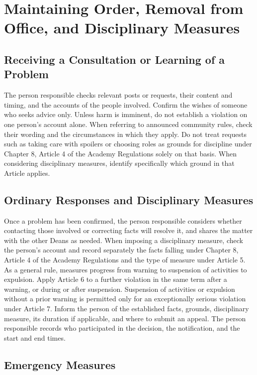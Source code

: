 \newpage
\chapter{Maintaining Order, Removal from Office, and Disciplinary Measures}

\section{Receiving a Consultation or Learning of a Problem}

The person responsible checks relevant posts or requests, their content and timing, and the accounts of the people involved.
Confirm the wishes of someone who seeks advice only. Unless harm is imminent, do not establish a violation on one person's account alone.
When referring to announced community rules, check their wording and the circumstances in which they apply.
Do not treat requests such as taking care with spoilers or choosing roles as grounds for discipline under Chapter 8, Article 4 of the Academy Regulations solely on that basis.
When considering disciplinary measures, identify specifically which ground in that Article applies.

\section{Ordinary Responses and Disciplinary Measures}

Once a problem has been confirmed, the person responsible considers whether contacting those involved or correcting facts will resolve it, and shares the matter with the other Deans as needed.
When imposing a disciplinary measure, check the person's account and record separately the facts falling under Chapter 8, Article 4 of the Academy Regulations and the type of measure under Article 5.
As a general rule, measures progress from warning to suspension of activities to expulsion. Apply Article 6 to a further violation in the same term after a warning, or during or after suspension.
Suspension of activities or expulsion without a prior warning is permitted only for an exceptionally serious violation under Article 7.
Inform the person of the established facts, grounds, disciplinary measure, its duration if applicable, and where to submit an appeal.
The person responsible records who participated in the decision, the notification, and the start and end times.

\section{Emergency Measures}

